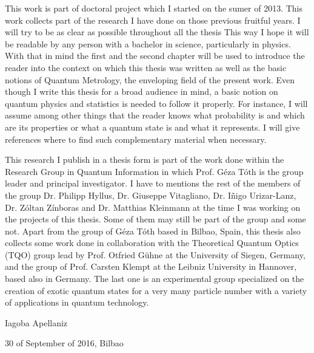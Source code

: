 This work is part of doctoral project which I started on the sumer of 2013.
This work collects part of the research I have done on those previous fruitful years.
I will try to be as clear as possible throughout all the thesis
This way I hope it will be readable by any person with a bachelor in science, particularly in physics.
With that in mind the first and the second chapter will be used to introduce the reader into the context on which this thesis was written as well as the basic notions of Quantum Metrology, the enveloping field of the present work.
Even though I write this thesis for a broad audience in mind, a basic notion on quantum physics and statistics is needed to follow it properly.
For instance, I will assume among other things that the reader knows what probability is and which are its properties or what a quantum state is and what it represents.
I will give references where to find such complementary material when necessary.

This research I publish in a thesis form is part of the work done within the Research Group in Quantum Information in which Prof. G\'eza T\'oth is the group leader and principal investigator.
I have to mentions the rest of the members of the group Dr. Philipp Hyllus, Dr. Giuseppe Vitagliano, Dr. I\~nigo Urizar-Lanz, Dr. Z\'oltan Z\'inboras and Dr. Matthias Kleinmann at the time I was working on the projects of this thesis. Some of them may still be part of the group and some not.
Apart from the group of G\'eza T\'oth based in Bilbao, Spain, this thesis also collects some work done in collaboration with the Theoretical Quantum Optics (TQO) group lead by Prof. Otfried G\"uhne at the University of Siegen, Germany, and the group of Prof. Carsten Klempt at the Leibniz University in Hannover, based also in Germany. The last one is an experimental group specialized on the creation of exotic quantum states for a very many particle number with a variety of applications in quantum technology.

\begin{flushright}
  Iagoba Apellaniz

  30 of September of 2016, Bilbao
\end{flushright}
